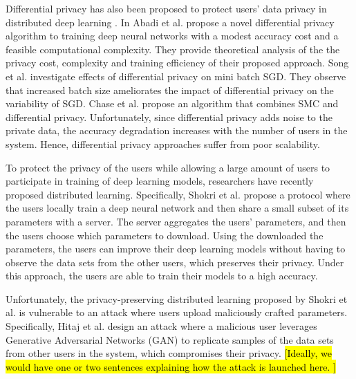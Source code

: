 \documentclass[conference]{IEEEtran}
\begin{document}
Differential privacy has also been proposed to protect users' data privacy  in distributed deep learning
\cite{vepakomma2018no}. 
In Abadi et al. \cite{abadi2016deep} propose a novel differential privacy algorithm to training deep neural networks with a modest
accuracy cost and a feasible computational complexity. They provide theoretical analysis of the the privacy cost, complexity and
training efficiency of their proposed approach. 
Song et al. \cite{song2013stochastic} investigate effects of differential privacy on mini batch SGD. They observe that increased batch
size ameliorates the impact of differential privacy on the variability of SGD. 
Chase et al. \cite{chase2017private} propose an algorithm that combines  SMC and differential privacy. 
Unfortunately, since differential privacy adds noise to the private data, the accuracy degradation increases with the number of users
in the system. Hence, differential privacy approaches suffer from poor scalability. 

To protect the privacy of the users while allowing a large amount of users to participate in training of deep learning
models, researchers have recently proposed distributed learning. Specifically, Shokri et al. \cite{shokri2015privacy} propose 
a protocol where the users locally train a deep neural network and then share a small subset of its parameters
with a server. The server aggregates the users' parameters, and then the users choose which parameters to download. 
Using the downloaded the parameters, the users can improve their deep learning models without having to observe the data sets from the
other users, which preserves their privacy. Under this approach, the users are able to train their models to a high accuracy. 

Unfortunately, the privacy-preserving distributed learning proposed by Shokri et al. \cite{shokri2015privacy} is vulnerable to an
attack where users upload maliciously crafted parameters. Specifically, Hitaj  et al. \cite{hitaj2017deep} design
an attack where a malicious user 
leverages Generative Adversarial Networks (GAN) to replicate samples of the data sets from other users in the system, which compromises
their privacy. \hl{[Ideally, we would have one or two sentences explaining how the attack is launched here. ]} 
\end{document}
